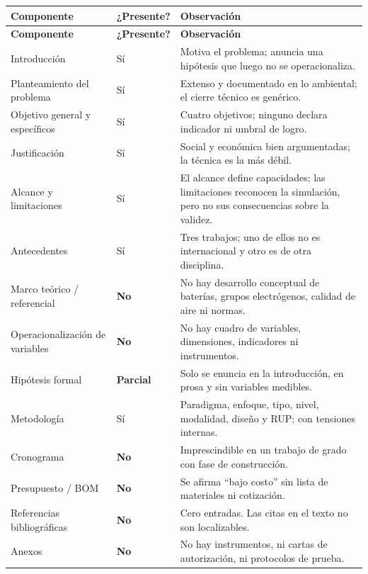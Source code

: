 \documentclass[11pt,a4paper]{article}
\begin{document}
\begingroup\small
\begin{longtable}{@{}>{\raggedright\arraybackslash}p{4.6cm} >{\centering\arraybackslash}p{1.7cm} >{\raggedright\arraybackslash}p{9.0cm}@{}}
\toprule
\textbf{Componente} & \textbf{¿Presente?} & \textbf{Observación} \\
\midrule
\endfirsthead
\toprule
\textbf{Componente} & \textbf{¿Presente?} & \textbf{Observación} \\
\midrule
\endhead
Introducción & Sí & Motiva el problema; anuncia una hipótesis que luego no se operacionaliza. \\
Planteamiento del problema & Sí & Extenso y documentado en lo ambiental; el cierre técnico es genérico. \\
Objetivo general y específicos & Sí & Cuatro objetivos; ninguno declara indicador ni umbral de logro. \\
Justificación & Sí & Social y económica bien argumentadas; la técnica es la más débil. \\
Alcance y limitaciones & Sí & El alcance define capacidades; las limitaciones reconocen la simulación, pero no sus consecuencias sobre la validez. \\
Antecedentes & Sí & Tres trabajos; uno de ellos no es internacional y otro es de otra disciplina. \\
Marco teórico / referencial & \textbf{No} & No hay desarrollo conceptual de baterías, grupos electrógenos, calidad de aire ni normas. \\
Operacionalización de variables & \textbf{No} & No hay cuadro de variables, dimensiones, indicadores ni instrumentos. \\
Hipótesis formal & \textbf{Parcial} & Solo se enuncia en la introducción, en prosa y sin variables medibles. \\
Metodología & Sí & Paradigma, enfoque, tipo, nivel, modalidad, diseño y RUP; con tensiones internas. \\
Cronograma & \textbf{No} & Imprescindible en un trabajo de grado con fase de construcción. \\
Presupuesto / BOM & \textbf{No} & Se afirma ``bajo costo'' sin lista de materiales ni cotización. \\
Referencias bibliográficas & \textbf{No} & Cero entradas. Las citas en el texto no son localizables. \\
Anexos & \textbf{No} & No hay instrumentos, ni cartas de autorización, ni protocolos de prueba. \\
\bottomrule
\end{longtable}
\endgroup
\end{document}
